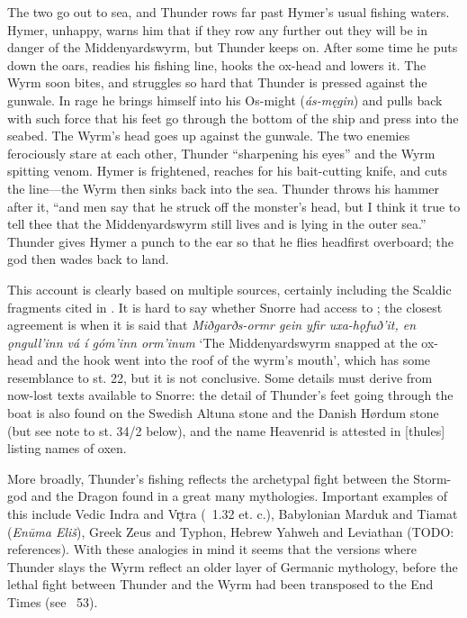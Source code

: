 {The two go out to sea, and Thunder rows far past Hymer’s usual fishing waters.  Hymer, unhappy, warns him that if they row any further out they will be in danger of the Middenyardswyrm, but Thunder keeps on.  After some time he puts down the oars, readies his fishing line, hooks the ox-head and lowers it.  The Wyrm soon bites, and struggles so hard that Thunder is pressed against the gunwale.  In rage he brings himself into his Os-might (\emph{ás-męgin}) and pulls back with such force that his feet go through the bottom of the ship and press into the seabed.  The Wyrm's head goes up against the gunwale.  The two enemies ferociously stare at each other, Thunder “sharpening his eyes” and the Wyrm spitting venom.  Hymer is frightened, reaches for his bait-cutting knife, and cuts the line—the Wyrm then sinks back into the sea.  Thunder throws his hammer after it, “and men say that he struck off the monster’s head, but I think it true to tell thee that the Middenyardswyrm still lives and is lying in the outer sea.”  Thunder gives Hymer a punch to the ear so that he flies headfirst overboard; the god then wades back to land.

This account is clearly based on multiple sources, certainly including the Scaldic fragments cited in \Skaldskaparmal.  It is hard to say whether Snorre had access to \Hymiskvida; the closest agreement is when it is said that \emph{Miðgarðs-ormr gein yfir uxa-hǫfuð’it, en ǫngull’inn vá í góm’inn orm’inum} ‘The Middenyardswyrm snapped at the ox-head and the hook went into the roof of the wyrm’s mouth’, which has some resemblance to st. 22, but it is not conclusive.  Some details must derive from now-lost texts available to Snorre: the detail of Thunder’s feet going through the boat is also found on the Swedish Altuna stone and the Danish Hørdum stone (but see note to st. 34/2 below), and the name Heavenrid is attested in [thules] listing names of oxen.

More broadly, Thunder’s fishing reflects the archetypal fight between the Storm-god and the Dragon found in a great many mythologies.  Important examples of this include Vedic Indra and Vr̥tra (\Rigveda\ 1.32 et. c.), Babylonian Marduk and Tiamat (\emph{Enūma Eliš}), Greek Zeus and Typhon, Hebrew Yahweh and Leviathan (TODO: references).  With these analogies in mind it seems that the versions where Thunder slays the Wyrm reflect an older layer of Germanic mythology, before the lethal fight between Thunder and the Wyrm had been transposed to the End Times (see \Voluspa\ 53).}

